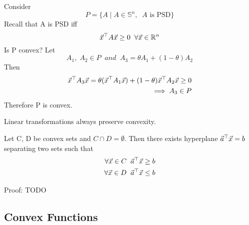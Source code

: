 \begin{example}
	Consider
	\[
P = \{A\;|\;A\in\mathbb{S}^n,\;\;A\text{ is PSD}\}
	\]
	Recall that A is PSD iff
	\[
\vec{x}^\top A\vec{x} \ge 0 \;\;\forall\vec{x}\in\mathbb{R}^n
	\]
	Is P convex? Let
	\[
A_1,\;A_2 \in P\;\;and\;\;A_3 = \theta A_1+(1-\theta)A_2
	\]
	Then
	\begin{align*}
		\vec{x}^\top A_3\vec{x} = \theta(\vec{x}^\top A_1\vec{x}) + (1-\theta)\vec{x}^\top A_2\vec{x} \ge 0\\
		\implies A_3\in P
	\end{align*}
	Therefore P is convex.
\end{example}

\begin{remark}
	Linear transformations always preserve convexity.
\end{remark}

\begin{theorem}
	Let C, D be convex sets and $C \cap D = \emptyset$. Then there exists hyperplane $\vec{a}^\top\vec{x} = b$ separating two sets such that
	\begin{align*}
		\forall \vec{x}\in C\;\; \vec{a}^\top\vec{x}\ge b\\
		\forall \vec{x}\in D\;\; \vec{a}^\top\vec{x}\le b\\
	\end{align*}
\end{theorem}

Proof: TODO


\subsection{Convex Functions} %
\label{sub:convex_functions}


